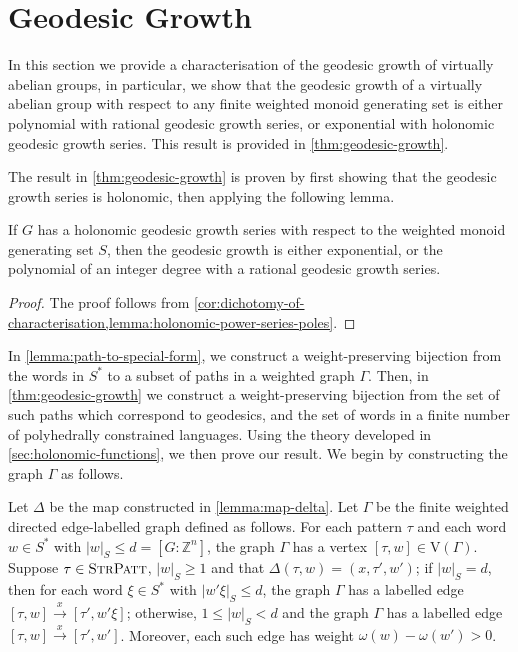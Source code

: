 \section{Geodesic Growth}\label{sec:geodesic-growth}


In this section we provide a characterisation of the geodesic growth of virtually abelian groups, in particular, we show that the geodesic growth of a virtually abelian group with respect to any finite weighted monoid generating set is either polynomial with rational geodesic growth series, or exponential with holonomic geodesic growth series.
This result is provided in \cref{thm:geodesic-growth}.

The result in \cref{thm:geodesic-growth} is proven by first showing that the geodesic growth series is holonomic, then applying the following lemma.

\begin{lemma}\label{lemma:holonomic-growth-series}
	If $G$ has a holonomic geodesic growth series with respect to the weighted monoid generating set $S$, then the geodesic growth is either exponential, or the polynomial of an integer degree with a rational geodesic growth series.
\end{lemma}

\begin{proof}
	The proof follows from \cref{cor:dichotomy-of-characterisation,lemma:holonomic-power-series-poles}.
\end{proof}

In \cref{lemma:path-to-special-form}, we construct a weight-preserving bijection from the words in $S^*$ to a subset of paths in a weighted graph $\Gamma$.
Then, in \cref{thm:geodesic-growth} we construct a weight-preserving bijection from the set of such paths which correspond to geodesics, and the set of words in a finite number of polyhedrally constrained languages.
Using the theory developed in \cref{sec:holonomic-functions}, we then prove our result.
We begin by constructing the graph $\Gamma$ as follows.

\begin{definition}\label{defn:graph-gamma}
	Let $\Delta$ be the map constructed in \cref{lemma:map-delta}.
	Let $\Gamma$ be the finite weighted directed edge-labelled graph defined as follows.
	For each pattern $\tau$ and each word $w \in S^*$ with $|w|_S \leqslant d = [G:\mathbb{Z}^n]$, the graph $\Gamma$ has a vertex $[\tau,w] \in \mathrm{V}(\Gamma)$.
	Suppose $\tau \in \textsc{StrPatt}$, $|w|_S \geqslant 1$ and that $\Delta(\tau,w) = (x,\tau',w')$;
	if $|w|_S = d$, then for each word $\xi \in S^*$ with $|w'\xi|_S \leqslant d$, the graph $\Gamma$ has a labelled edge $[\tau,w] \xrightarrow{x} [\tau',w'\xi]$;
	otherwise, $1 \leqslant |w|_S < d$ and the graph $\Gamma$ has a labelled edge $[\tau,w] \xrightarrow{x} [\tau',w']$.
	Moreover, each such edge has weight $\omega(w)-\omega(w') > 0$.
\end{definition}

